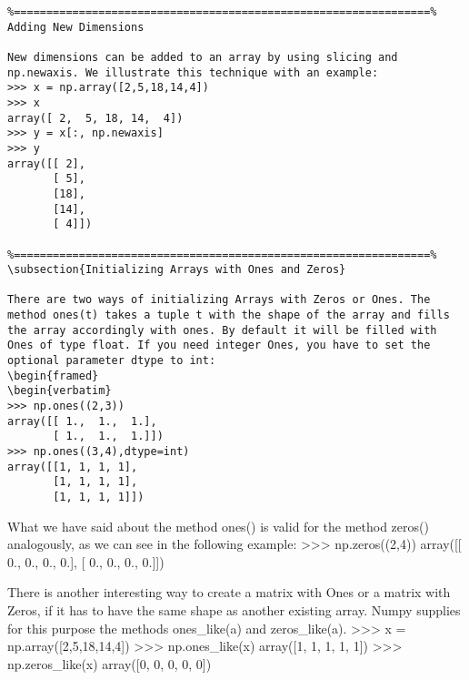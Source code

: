 \begin{framed}
\begin{verbatim}
%================================================================%
Adding New Dimensions

New dimensions can be added to an array by using slicing and np.newaxis. We illustrate this technique with an example:
>>> x = np.array([2,5,18,14,4])
>>> x
array([ 2,  5, 18, 14,  4])
>>> y = x[:, np.newaxis]
>>> y
array([[ 2],
       [ 5],
       [18],
       [14],
       [ 4]])

%================================================================%
\subsection{Initializing Arrays with Ones and Zeros}

There are two ways of initializing Arrays with Zeros or Ones. The method ones(t) takes a tuple t with the shape of the array and fills the array accordingly with ones. By default it will be filled with Ones of type float. If you need integer Ones, you have to set the optional parameter dtype to int:
\begin{framed}
\begin{verbatim}
>>> np.ones((2,3))
array([[ 1.,  1.,  1.],
       [ 1.,  1.,  1.]])
>>> np.ones((3,4),dtype=int)
array([[1, 1, 1, 1],
       [1, 1, 1, 1],
       [1, 1, 1, 1]])
\end{verbatim}
\end{framed}
What we have said about the method ones() is valid for the method zeros() analogously, as we can see in the following example:
>>> np.zeros((2,4))
array([[ 0.,  0.,  0.,  0.],
       [ 0.,  0.,  0.,  0.]])

There is another interesting way to create a matrix with Ones or a matrix with Zeros, if it has to have the same shape as another existing array. Numpy supplies for this purpose the methods ones_like(a) and zeros_like(a).
>>> x = np.array([2,5,18,14,4])
>>> np.ones_like(x)
array([1, 1, 1, 1, 1])
>>> np.zeros_like(x)
array([0, 0, 0, 0, 0])

\newpage


